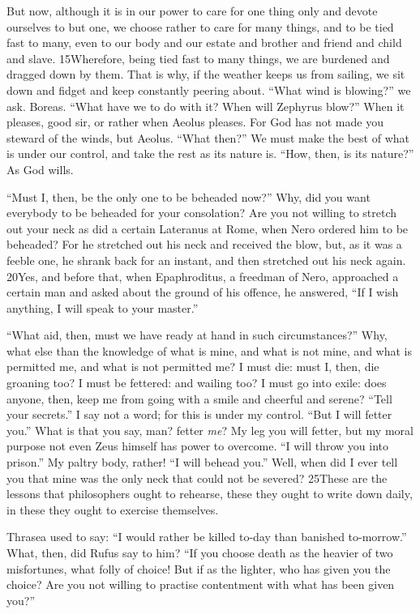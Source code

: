 But now, although it is in our power to care for one thing only and devote ourselves to but one, we choose rather to care for many things, and to be tied fast to many, even to our body and our estate and brother and friend and child and slave. 15Wherefore, being tied fast to many things, we are burdened and dragged down by them. That is why, if the weather keeps us from sailing, we sit down and fidget and keep constantly peering about. ``What wind is blowing?'' we ask. Boreas. ``What have we to do with it? When will Zephyrus blow?'' When it pleases, good sir, or rather when Aeolus pleases. For God has not made you steward of the winds, but Aeolus. ``What then?'' We must make the best of what is under our control, and take the rest as its nature is. ``How, then, is its nature?'' As God wills.

``Must I, then, be the only one to be beheaded now?'' Why, did you want everybody to be beheaded for your consolation? Are you not willing to stretch out your neck as did a certain Lateranus at Rome, when Nero ordered him to be beheaded? For he stretched out his neck and received the blow, but, as it was a feeble one, he shrank back for an instant, and then stretched out his neck again. 20Yes, and before that, when Epaphroditus, a freedman of Nero, approached a certain man and asked about the ground of his offence, he answered, ``If I wish anything, I will speak to your master.''

``What aid, then, must we have ready at hand in such circumstances?'' Why, what else than the knowledge of what is mine, and what is not mine, and what is permitted me, and what is not permitted me? I must die: must I, then, die groaning too? I must be fettered: and wailing too? I must go into exile: does anyone, then, keep me from going with a smile and cheerful and serene? ``Tell your secrets.'' I say not a word; for this is under my control. ``But I will fetter you.'' What is that you say, man? fetter \emph{me}? My leg you will fetter, but my moral purpose not even Zeus himself has power to overcome. ``I will throw you into prison.'' My paltry body, rather! ``I will behead you.'' Well, when did I ever tell you that mine was the only neck that could not be severed? 25These are the lessons that philosophers ought to rehearse, these they ought to write down daily, in these they ought to exercise themselves.

Thrasea used to say: ``I would rather be killed to-day than banished to-morrow.'' What, then, did Rufus say to him? ``If you choose death as the heavier of two misfortunes, what folly of choice! But if as the lighter, who has given you the choice? Are you not willing to practise contentment with what has been given you?''

